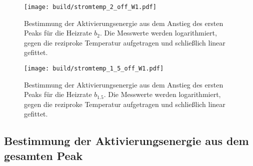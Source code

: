 \begin{figure}
  \centering
  \texttt{[image: build/stromtemp\_2\_off\_W1.pdf]}
  \caption{Bestimmung der Aktivierungsenergie aus dem Anstieg des ersten Peaks für die Heizrate $b_{2}$.
  Die Messwerte werden logarithmiert, gegen die reziproke Temperatur aufgetragen und schließlich linear gefittet.}
  \label{fig:messwerte2offW1}
\end{figure}

\begin{figure}
  \centering
  \texttt{[image: build/stromtemp\_1\_5\_off\_W1.pdf]}
  \caption{Bestimmung der Aktivierungsenergie aus dem Anstieg des ersten Peaks für die Heizrate $b_{1.5}$.
  Die Messwerte werden logarithmiert, gegen die reziproke Temperatur aufgetragen und schließlich linear gefittet.}
  \label{fig:messwerte15offW1}
\end{figure}

\subsection{Bestimmung der Aktivierungsenergie aus dem gesamten Peak}

